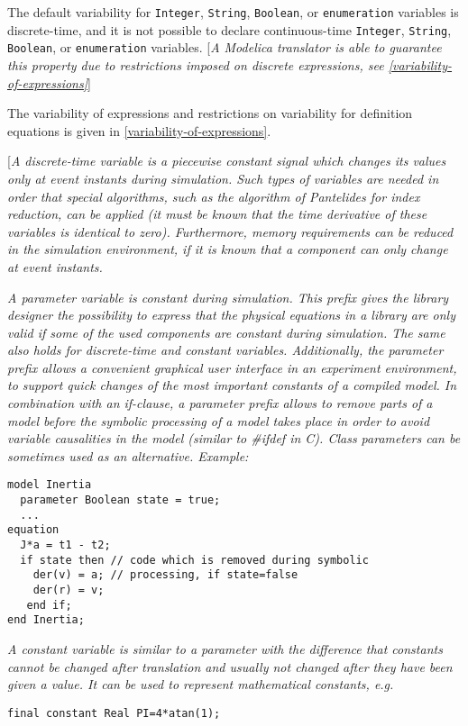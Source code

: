 The default variability for \lstinline!Integer!, \lstinline!String!,
\lstinline!Boolean!, or \lstinline!enumeration!
variables is discrete-time, and it is not possible to declare
continuous-time \lstinline!Integer!, \lstinline!String!, \lstinline!Boolean!, or
\lstinline!enumeration! variables.
{[}\emph{A Modelica translator is able to guarantee this property due to
restrictions imposed on discrete expressions, see \autoref{variability-of-expressions}}{]}

The variability of expressions and restrictions on variability for
definition equations is given in \autoref{variability-of-expressions}.

{[}\emph{A discrete-time variable is a piecewise constant signal which
changes its values only at event instants during simulation. Such types
of variables are needed in order that special algorithms, such as the
algorithm of Pantelides for index reduction, can be applied (it must be
known that the time derivative of these variables is identical to zero).
Furthermore, memory requirements can be reduced in the simulation
environment, if it is known that a component can only change at event
instants. }

\emph{A parameter variable is constant during simulation. This prefix
gives the library designer the possibility to express that the physical
equations in a library are only valid if some of the used components are
constant during simulation. The same also holds for discrete-time and
constant variables. Additionally, the parameter prefix allows a
convenient graphical user interface in an experiment environment, to
support quick changes of the most important constants of a compiled
model. In combination with an if-clause, a parameter prefix allows to
remove parts of a model before the symbolic processing of a model takes
place in order to avoid variable causalities in the model (similar to
\#ifdef in C). Class parameters can be sometimes used as an alternative.
Example: }
\begin{lstlisting}[language=modelica]
model Inertia
  parameter Boolean state = true;
  ...
equation
  J*a = t1 - t2;
  if state then // code which is removed during symbolic
    der(v) = a; // processing, if state=false
    der(r) = v;
   end if;
end Inertia;
\end{lstlisting}

\emph{A constant variable is similar to a parameter with the difference
that constants cannot be changed after translation and usually not
changed after they have been given a value. It can be used to represent
mathematical constants, e.g. }
\begin{lstlisting}[language=modelica]
final constant Real PI=4*atan(1);
\end{lstlisting}

